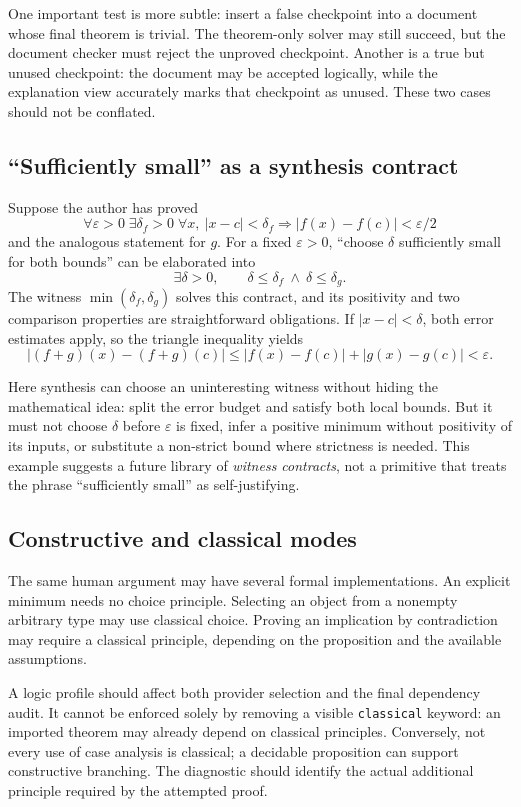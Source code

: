 \documentclass[11pt,a4paper]{article}
\newcommand{\code}[1]{\texttt{\small #1}}
\theoremstyle{definition}
\theoremstyle{remark}
\begin{document}
One important test is more subtle: insert a false checkpoint into a document whose final theorem is trivial. The theorem-only solver may still succeed, but the document checker must reject the unproved checkpoint. Another is a true but unused checkpoint: the document may be accepted logically, while the explanation view accurately marks that checkpoint as unused. These two cases should not be conflated.

\subsection{``Sufficiently small'' as a synthesis contract}
Suppose the author has proved
\[
 \forall\varepsilon>0\;\exists\delta_f>0\;
 \forall x,\ |x-c|<\delta_f\Rightarrow|f(x)-f(c)|<\varepsilon/2
\]
and the analogous statement for $g$. For a fixed $\varepsilon>0$, ``choose $\delta$ sufficiently small for both bounds'' can be elaborated into
\[
 \exists\delta>0,\qquad \delta\le\delta_f\ \land\ \delta\le\delta_g.
\]
The witness $\min(\delta_f,\delta_g)$ solves this contract, and its positivity and two comparison properties are straightforward obligations. If $|x-c|<\delta$, both error estimates apply, so the triangle inequality yields
\[
 |(f+g)(x)-(f+g)(c)|
 \le |f(x)-f(c)|+|g(x)-g(c)|<\varepsilon.
\]

Here synthesis can choose an uninteresting witness without hiding the mathematical idea: split the error budget and satisfy both local bounds. But it must not choose $\delta$ before $\varepsilon$ is fixed, infer a positive minimum without positivity of its inputs, or substitute a non-strict bound where strictness is needed. This example suggests a future library of \emph{witness contracts}, not a primitive that treats the phrase ``sufficiently small'' as self-justifying.

\subsection{Constructive and classical modes}
The same human argument may have several formal implementations. An explicit minimum needs no choice principle. Selecting an object from a nonempty arbitrary type may use classical choice. Proving an implication by contradiction may require a classical principle, depending on the proposition and the available assumptions.

A logic profile should affect both provider selection and the final dependency audit. It cannot be enforced solely by removing a visible \code{classical} keyword: an imported theorem may already depend on classical principles. Conversely, not every use of case analysis is classical; a decidable proposition can support constructive branching. The diagnostic should identify the actual additional principle required by the attempted proof.
\end{document}
